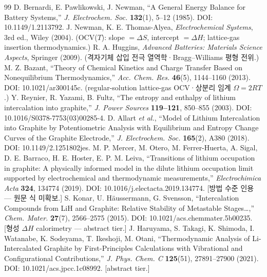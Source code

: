 \begin{thebibliography}{99}
 D. Bernardi, E. Pawlikowski, J. Newman, ``A General Energy Balance for Battery Systems,'' \emph{J. Electrochem. Soc.} \textbf{132}(1), 5--12 (1985). DOI: 10.1149/1.2113792.
 J. Newman, K. E. Thomas-Alyea, \emph{Electrochemical Systems}, 3rd ed., Wiley (2004). (OCV($T$): slope $=\Delta S$, intercept $=\Delta H$; lattice-gas insertion thermodynamics.)
 R. A. Huggins, \emph{Advanced Batteries: Materials Science Aspects}, Springer (2009). (격자기체 삽입 전극 열역학·Bragg--Williams 평형 전위.)
 M. Z. Bazant, ``Theory of Chemical Kinetics and Charge Transfer Based on Nonequilibrium Thermodynamics,'' \emph{Acc. Chem. Res.} \textbf{46}(5), 1144--1160 (2013). DOI: 10.1021/ar300145c. (regular-solution lattice-gas OCV·상분리 임계 $\Omega=2RT$.)
 Y. Reynier, R. Yazami, B. Fultz, ``The entropy and enthalpy of lithium intercalation into graphite,'' \emph{J. Power Sources} \textbf{119--121}, 850--855 (2003). DOI: 10.1016/S0378-7753(03)00285-4.
 D. Allart \emph{et al.}, ``Model of Lithium Intercalation into Graphite by Potentiometric Analysis with Equilibrium and Entropy Change Curves of the Graphite Electrode,'' \emph{J. Electrochem. Soc.} \textbf{165}(2), A380 (2018). DOI: 10.1149/2.1251802jes.
 M. P. Mercer, M. Otero, M. Ferrer-Huerta, A. Sigal, D. E. Barraco, H. E. Hoster, E. P. M. Leiva, ``Transitions of lithium occupation in graphite: A physically informed model in the dilute lithium occupation limit supported by electrochemical and thermodynamic measurements,'' \emph{Electrochimica Acta} \textbf{324}, 134774 (2019). DOI: 10.1016/j.electacta.2019.134774. [방법 수준 인용 --- 원문 식 미확보.]
 S. Konar, U. Häussermann, G. Svensson, ``Intercalation Compounds from LiH and Graphite: Relative Stability of Metastable Stages\ldots,'' \emph{Chem. Mater.} \textbf{27}(7), 2566--2575 (2015). DOI: 10.1021/acs.chemmater.5b00235. [형성 $\Delta H$ calorimetry --- abstract tier.]
 J. Haruyama, S. Takagi, K. Shimoda, I. Watanabe, K. Sodeyama, T. Ikeshoji, M. Otani, ``Thermodynamic Analysis of Li-Intercalated Graphite by First-Principles Calculations with Vibrational and Configurational Contributions,'' \emph{J. Phys. Chem. C} \textbf{125}(51), 27891--27900 (2021). DOI: 10.1021/acs.jpcc.1c08992. [abstract tier.]

\end{thebibliography}

